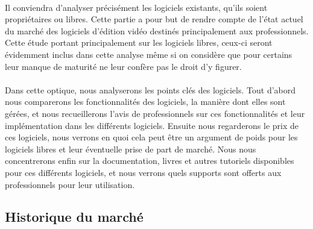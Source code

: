 \paragraph{}

Il conviendra d'analyser précisément les logiciels existants, qu'ils
soient propriétaires ou libres. Cette partie a pour but de rendre compte
de l'état actuel du marché des logiciels d'édition vidéo destinés
principalement aux professionnels. Cette étude portant principalement
sur les logiciels libres, ceux-ci seront évidemment inclus dans cette
analyse même si on considère que pour certains leur manque de maturité
ne leur confère pas le droit d'y figurer.

\paragraph{}

Dans cette optique, nous analyserons les points clés des logiciels.
Tout d'abord nous comparerons les fonctionnalités des logiciels, la manière
dont elles sont gérées, et nous recueillerons l'avis de professionnels
sur ces fonctionnalités et leur implémentation dans les différents
logiciels. Ensuite nous regarderons le prix de ces logiciels, nous verrons en quoi
cela peut être un argument de poids pour les logiciels libres et leur
éventuelle prise de part de marché. Nous nous concentrerons enfin
sur la documentation, livres et autres tutoriels disponibles pour ces
différents logiciels, et nous verrons quels supports sont offerts aux
professionnels pour leur utilisation.

\subsection {Historique du marché}

\paragraph{}

